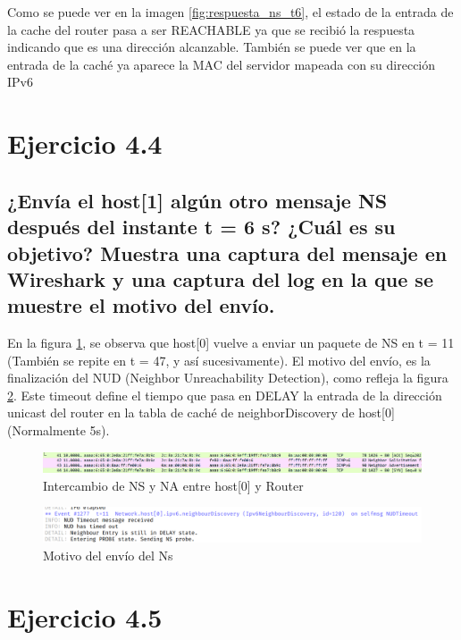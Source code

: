 \begin{enumerate}
    Como se puede ver en la imagen \ref{fig:respuesta_ns_t6}, el estado de la entrada de la cache del router pasa a ser REACHABLE ya que se recibió la respuesta indicando que es una dirección alcanzable. También se puede ver que en la entrada de la caché ya aparece la MAC del servidor mapeada con su dirección IPv6 

\end{enumerate}



\section{Ejercicio 4.4}
\subsection{¿Envía el host[1] algún otro mensaje NS después del instante t = 6 s? ¿Cuál es su objetivo? Muestra una captura del mensaje en Wireshark y una captura del log en la que se muestre el motivo del envío.}

En la figura \ref{fig:postNShost0}, se observa que host[0] vuelve a enviar un paquete de NS en t = 11 (También se repite en t = 47, y así sucesivamente). El motivo del envío, es la finalización del NUD (Neighbor Unreachability Detection), como refleja la figura \ref{fig:NS_purpose}. Este timeout define el tiempo que pasa en DELAY la entrada de la dirección unicast del router en la tabla de caché de neighborDiscovery de host[0] (Normalmente 5s).

\begin{figure}[H]
    \centering
    \includegraphics[width=135mm, scale=0.75]{imaxes/ejercicio4_4_1.png}
    \caption{Intercambio de NS y NA entre host[0] y Router}
    \label{fig:postNShost0}
\end{figure}

\begin{figure}[H]
    \centering
    \includegraphics[width=135mm, scale=0.75]{imaxes/ejercicio4_4_2.png}
    \caption{Motivo del envío del Ns}
    \label{fig:NS_purpose}
\end{figure}

\section{Ejercicio 4.5}
